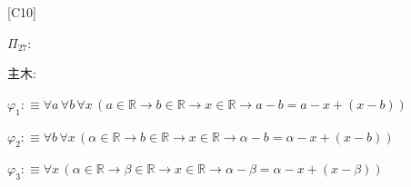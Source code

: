 \begin{fullproof}{[C10]}
\begin{ptree}
\end{ptree}
\noindent$\Pi_{27}$:
\begin{ptree}
\noLine
{}
\noLine
{}
\end{ptree}
\noindent 主木:
\begin{ptree}
\noLine
{}
\noLine
{}
\end{ptree}
\begin{abbrevlist}
\item $\varphi_{1} :\equiv \forall a\,\forall b\,\forall x\,(a \in \mathbb{R} \to b \in \mathbb{R} \to x \in \mathbb{R} \to a - b = a - x + (x - b))$
\item $\varphi_{2} :\equiv \forall b\,\forall x\,(\alpha \in \mathbb{R} \to b \in \mathbb{R} \to x \in \mathbb{R} \to \alpha - b = \alpha - x + (x - b))$
\item $\varphi_{3} :\equiv \forall x\,(\alpha \in \mathbb{R} \to \beta \in \mathbb{R} \to x \in \mathbb{R} \to \alpha - \beta = \alpha - x + (x - \beta))$

\end{abbrevlist}
\end{fullproof}
